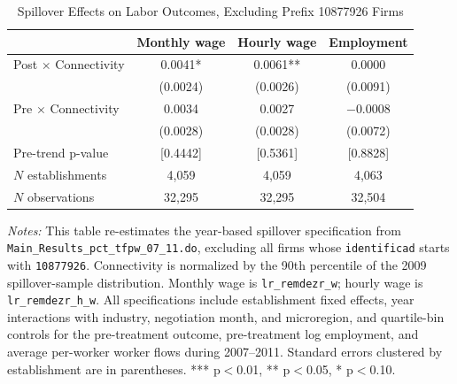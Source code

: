 \begin{table}[!htbp]
\centering
\caption{Spillover Effects on Labor Outcomes, Excluding Prefix 10877926 Firms}
\label{tab:labor_prefix_spill}
\scriptsize
\begin{tabular}{lccc}
\toprule
 & Monthly wage & Hourly wage & Employment \\
\midrule
Post $\times$ Connectivity & 0.0041* & 0.0061** & 0.0000\\
 & (0.0024) & (0.0026) & (0.0091)\\
Pre $\times$ Connectivity & 0.0034 & 0.0027 & $-$0.0008\\
 & (0.0028) & (0.0028) & (0.0072)\\
Pre-trend p-value & [0.4442] & [0.5361] & [0.8828]\\
$N$ establishments & 4{,}059 & 4{,}059 & 4{,}063\\
$N$ observations & 32{,}295 & 32{,}295 & 32{,}504\\
\bottomrule
\end{tabular}
\begin{minipage}{\linewidth}
\footnotesize\vspace{4pt}
\textit{Notes:} This table re-estimates the year-based spillover specification from \texttt{Main\_Results\_pct\_tfpw\_07\_11.do}, excluding all firms whose \texttt{identificad} starts with \texttt{10877926}. Connectivity is normalized by the 90th percentile of the 2009 spillover-sample distribution. Monthly wage is \texttt{lr\_remdezr\_w}; hourly wage is \texttt{lr\_remdezr\_h\_w}. All specifications include establishment fixed effects, year interactions with industry, negotiation month, and microregion, and quartile-bin controls for the pre-treatment outcome, pre-treatment log employment, and average per-worker worker flows during 2007--2011. Standard errors clustered by establishment are in parentheses. *** p$<$0.01, ** p$<$0.05, * p$<$0.10.
\end{minipage}
\end{table}
